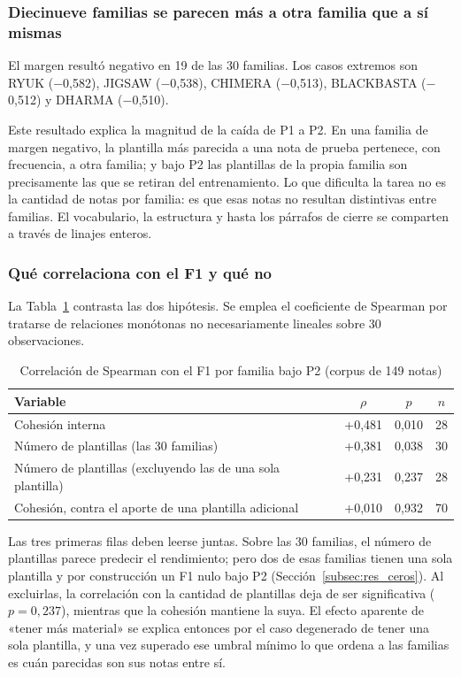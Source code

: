 \subsubsection*{Diecinueve familias se parecen más a otra familia que a sí mismas}

El margen resultó negativo en 19 de las 30 familias. Los casos extremos son RYUK ($-$0,582), JIGSAW ($-$0,538), CHIMERA ($-$0,513), BLACKBASTA ($-$0,512) y DHARMA ($-$0,510).

Este resultado explica la magnitud de la caída de P1 a P2. En una familia de margen negativo, la plantilla más parecida a una nota de prueba pertenece, con frecuencia, a otra familia; y bajo P2 las plantillas de la propia familia son precisamente las que se retiran del entrenamiento. Lo que dificulta la tarea no es la cantidad de notas por familia: es que esas notas no resultan distintivas entre familias. El vocabulario, la estructura y hasta los párrafos de cierre se comparten a través de linajes enteros.

\subsubsection*{Qué correlaciona con el F1 y qué no}

La Tabla~\ref{tab:correlaciones} contrasta las dos hipótesis. Se emplea el coeficiente de Spearman por tratarse de relaciones monótonas no necesariamente lineales sobre 30 observaciones.

\begin{table}[ht]
\centering
\caption{Correlación de Spearman con el F1 por familia bajo P2 (corpus de 149 notas)}
\label{tab:correlaciones}
\begin{tabular}{|l|c|c|c|}
\hline
\textbf{Variable} & \textbf{$\rho$} & \textbf{$p$} & \textbf{$n$} \\
\hline
Cohesión interna & +0,481 & 0,010 & 28 \\
Número de plantillas (las 30 familias) & +0,381 & 0,038 & 30 \\
Número de plantillas (excluyendo las de una sola plantilla) & +0,231 & 0,237 & 28 \\
Cohesión, contra el aporte de una plantilla adicional & +0,010 & 0,932 & 70 \\
\hline
\end{tabular}
\end{table}

Las tres primeras filas deben leerse juntas. Sobre las 30 familias, el número de plantillas parece predecir el rendimiento; pero dos de esas familias tienen una sola plantilla y por construcción un F1 nulo bajo P2 (Sección~\ref{subsec:res_ceros}). Al excluirlas, la correlación con la cantidad de plantillas deja de ser significativa ($p = 0{,}237$), mientras que la cohesión mantiene la suya. El efecto aparente de «tener más material» se explica entonces por el caso degenerado de tener una sola plantilla, y una vez superado ese umbral mínimo lo que ordena a las familias es cuán parecidas son sus notas entre sí.


